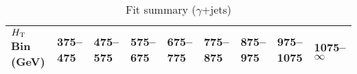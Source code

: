 \documentclass[8pt]{article}
\def\scalht{\mbox{$H_{\rm{T}}$}\xspace}
\begin{document}
\begin{table}[ht!]
\caption{Fit summary ($\gamma$+jets)}
\label{tab:ensemble-summary}
\centering
\begin{tabular}{ lllllllll }

\hline
\scalht Bin (GeV)       & 375--475                       & 475--575                       & 575--675                       & 675--775                       & 775--875                       & 875--975                       & 975--1075                      & 1075--$\infty$                 \\ [1.000000ex]
\hline

\end{tabular}
\end{table}
\end{document}
